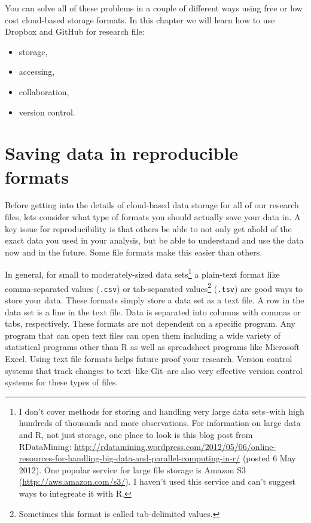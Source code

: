 You can solve all of these problems in a couple of different ways using free or low cost cloud-based storage formats. In this chapter we will learn how to use Dropbox and GitHub for research file:

\begin{itemize}
    \item storage,
    \item accessing,
    \item collaboration,
    \item version control.
\end{itemize}

\section{Saving data in reproducible formats}

Before getting into the details of cloud-based data storage for all of our research files, lets consider what type of formats you should actually save your data in. A key issue for reproducibility is that others be able to not only get ahold of the exact data you used in your analysis, but be able to understand and use the data now and in the future. Some file formats make this easier than others.

In general, for small to moderately-sized data sets\footnote{I don't cover methods for storing and handling very large data sets--with high hundreds of thousands and more observations. For information on large data and R, not just storage, one place to look is this blog post from RDataMining: \url{http://rdatamining.wordpress.com/2012/05/06/online-resources-for-handling-big-data-and-parallel-computing-in-r/} (posted 6 May 2012). One popular service for large file storage is Amazon S3 (\url{http://aws.amazon.com/s3/}). I haven't used this service and can't suggest ways to integreate it with R.} a plain-text format like comma-separated values (\texttt{.csv}) or tab-separated values\footnote{Sometimes this format is called tab-delimited values.} (\texttt{.tsv}) are good ways to store your data. These formats simply store a data set as a text file. A row in the data set is a line in the text file. Data is separated into columns with commas or tabs, respectively. These formats are not dependent on a specific program. Any program that can open text files can open them including a wide variety of statistical programs other than R as well as spreadsheet programs like Microsoft Excel. Using text file formats helps future proof your research. Version control systems that track changes to text--like Git--are also very effective version control systems for these types of files. 

